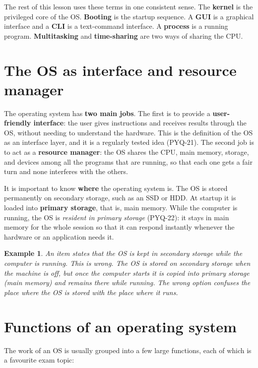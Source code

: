 \documentclass[11pt]{article}
\newtheorem{example}{Example}[section]
\begin{document}
The rest of this lesson uses these terms in one consistent sense. The
\textbf{kernel} is the privileged core of the OS. \textbf{Booting} is the
startup sequence. A \textbf{GUI} is a graphical interface and a \textbf{CLI}
is a text-command interface. A \textbf{process} is a running program.
\textbf{Multitasking} and \textbf{time-sharing} are two ways of sharing the
CPU.

\section{The OS as interface and resource manager}
The operating system has \textbf{two main jobs}. The first is to provide a
\textbf{user-friendly interface}: the user gives instructions and receives
results through the OS, without needing to understand the hardware. This is
the definition of the OS as an interface layer, and it is a regularly tested
idea (PYQ-21). The second job is to act as a \textbf{resource manager}: the OS
shares the CPU, main memory, storage, and devices among all the programs that
are running, so that each one gets a fair turn and none interferes with the
others.

It is important to know \textbf{where} the operating system is. The OS is
stored permanently on secondary storage, such as an SSD or HDD. At startup it
is loaded into \textbf{primary storage}, that is, main memory. While the
computer is running, the OS is \emph{resident in primary storage} (PYQ-22): it
stays in main memory for the whole session so that it can respond instantly
whenever the hardware or an application needs it.

\begin{example}
An item states that the OS is kept in secondary storage while the computer is
running. This is wrong. The OS is stored on secondary storage when the machine
is off, but once the computer starts it is copied into primary storage (main
memory) and remains there while running. The wrong option confuses the place
where the OS is stored with the place where it runs.
\end{example}

\section{Functions of an operating system}
The work of an OS is usually grouped into a few large functions, each of which
is a favourite exam topic:
\end{document}
